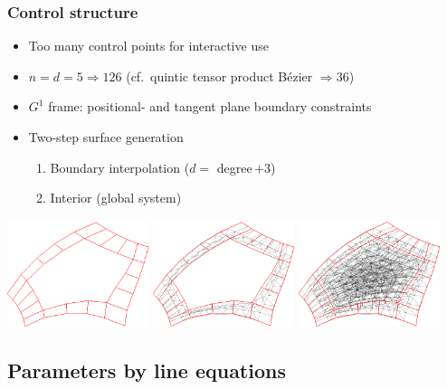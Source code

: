 \documentclass[xcolor=table]{beamer}
\begin{document}
\begin{frame}
  \frametitle{Control structure}
  \begin{itemize}
  \item Too many control points for interactive use
  \item $n=d=5\Rightarrow126$ (cf.~quintic tensor product B\'ezier $\Rightarrow36$)
  \item $G^1$ frame: positional- and tangent plane boundary constraints
  \item Two-step surface generation
    \begin{enumerate}
    \item Boundary interpolation ($d=$ degree\,$+3$)
    \item Interior (global system)
    \end{enumerate}
  \end{itemize}
  \vfill
  \includegraphics[width = 0.31\textwidth]{images/5-5-bezier-ribbon.png}
  \hfill
  \includegraphics[width = 0.31\textwidth]{images/5-5-cnet-ribbon.png}
  \hfill
  \includegraphics[width = 0.31\textwidth]{images/5-5-cnet-full.png}
\end{frame}

\subsection{Parameters by line equations}
\end{document}
